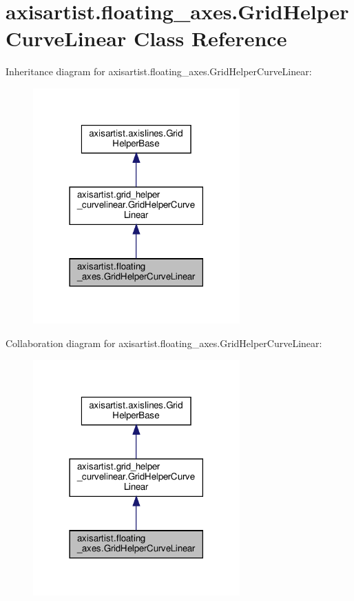 \hypertarget{classaxisartist_1_1floating__axes_1_1GridHelperCurveLinear}{}\section{axisartist.\+floating\+\_\+axes.\+Grid\+Helper\+Curve\+Linear Class Reference}
\label{classaxisartist_1_1floating__axes_1_1GridHelperCurveLinear}


Inheritance diagram for axisartist.\+floating\+\_\+axes.\+Grid\+Helper\+Curve\+Linear\+:
\nopagebreak
\begin{figure}[H]
\begin{center}
\leavevmode
\includegraphics[width=225pt]{classaxisartist_1_1floating__axes_1_1GridHelperCurveLinear__inherit__graph}
\end{center}
\end{figure}


Collaboration diagram for axisartist.\+floating\+\_\+axes.\+Grid\+Helper\+Curve\+Linear\+:
\nopagebreak
\begin{figure}[H]
\begin{center}
\leavevmode
\includegraphics[width=225pt]{classaxisartist_1_1floating__axes_1_1GridHelperCurveLinear__coll__graph}
\end{center}
\end{figure}
